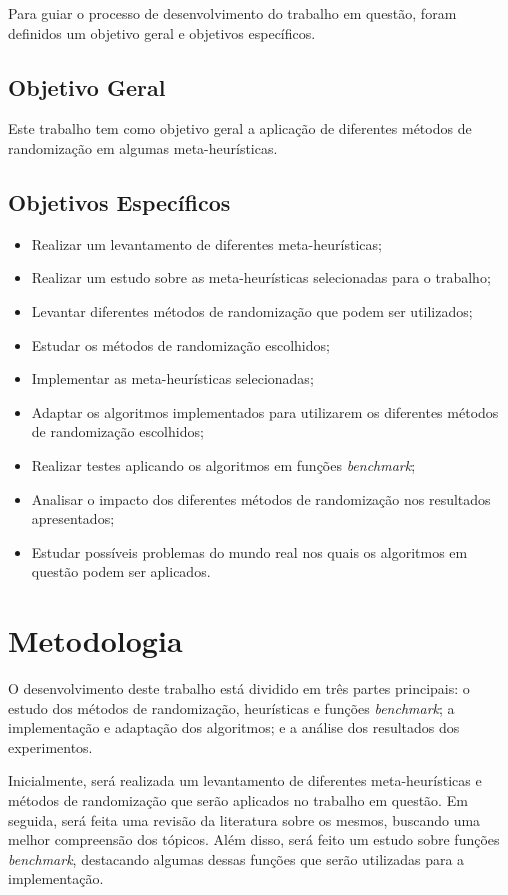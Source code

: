 Para guiar o processo de desenvolvimento do trabalho em questão, foram definidos um objetivo geral e objetivos específicos.

\subsection{Objetivo Geral}

Este trabalho tem como objetivo geral a aplicação de diferentes métodos de randomização em algumas meta-heurísticas.

\subsection{Objetivos Específicos}

\begin{itemize}
    \item Realizar um levantamento de diferentes meta-heurísticas;
    \item Realizar um estudo sobre as meta-heurísticas selecionadas para o trabalho;
    \item Levantar diferentes métodos de randomização que podem ser utilizados;
    \item Estudar os métodos de randomização escolhidos;
    \item Implementar as meta-heurísticas selecionadas;
    \item Adaptar os algoritmos implementados para utilizarem os diferentes métodos de randomização escolhidos;
    \item Realizar testes aplicando os algoritmos em funções \textit{benchmark};
    \item Analisar o impacto dos diferentes métodos de randomização nos resultados apresentados;
    \item Estudar possíveis problemas do mundo real nos quais os algoritmos em questão podem ser aplicados.
\end{itemize}

\section{Metodologia}

O desenvolvimento deste trabalho está dividido em três partes principais: o estudo dos métodos de randomização, heurísticas e funções \textit{benchmark}; a implementação e adaptação dos algoritmos; e a análise dos resultados dos experimentos.

Inicialmente, será realizada um levantamento de diferentes meta-heurísticas e métodos de randomização que serão aplicados no trabalho em questão. Em seguida, será feita uma revisão da literatura sobre os mesmos, buscando uma melhor compreensão dos tópicos. Além disso, será feito um estudo sobre funções \textit{benchmark}, destacando algumas dessas funções que serão utilizadas para a implementação.

